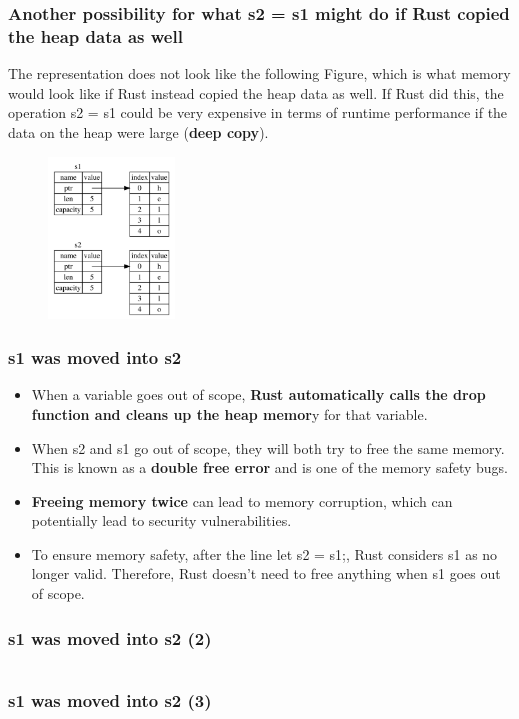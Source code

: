 \documentclass{beamer}
\begin{document}
\begin{frame}[fragile]
	\frametitle{Another possibility for what s2 = s1 might do if Rust copied the heap data as well}
	The representation does not look like the following Figure, which is what memory would look like if Rust instead copied the heap data as well. If Rust did this, the operation s2 = s1 could be very expensive in terms of runtime performance if the data on the heap were large (\textbf{deep copy}).
	\begin{figure}
		\centering
		\includegraphics[width=0.3\textwidth]{./img/trpl04-03.png}
		\label{fig:figureSAnotherPossibility}
	\end{figure}
\end{frame}

\begin{frame}[fragile]
	\frametitle{s1 was moved into s2}
	\begin{itemize}
		\item When a variable goes out of scope, \textbf{Rust automatically calls the drop function and cleans up the heap memor}y for that variable. 
		\item When s2 and s1 go out of scope, they will both try to free the same memory. This is known as a \textbf{double free error} and is one of the memory safety bugs.
		\item \textbf{Freeing memory twice} can lead to memory corruption, which can potentially lead to security vulnerabilities.
		\item To ensure memory safety, after the line let s2 = s1;, Rust considers s1 as no longer valid. Therefore, Rust doesn’t need to free anything when s1 goes out of scope.
	\end{itemize}
	
\end{frame}

\begin{frame}[fragile]
	\frametitle{s1 was moved into s2 (2)}
	\inputminted{rust}{./code/move-string.rs}
\end{frame}
\begin{frame}[fragile]
	\frametitle{s1 was moved into s2 (3)}
	\inputminted{shell}{./code/move-string.shell}
\end{frame}
\end{document}
